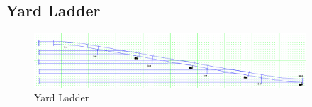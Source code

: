 \subsection{Yard Ladder}
\label{sec:YardLadder}
\begin{figure}[hbpt]\begin{centering}%
\includegraphics[width=4in]{ESP32S3-YardLadder.png}
\caption{Yard Ladder}
\label{fig:YardLadder}
\end{centering}\end{figure}

